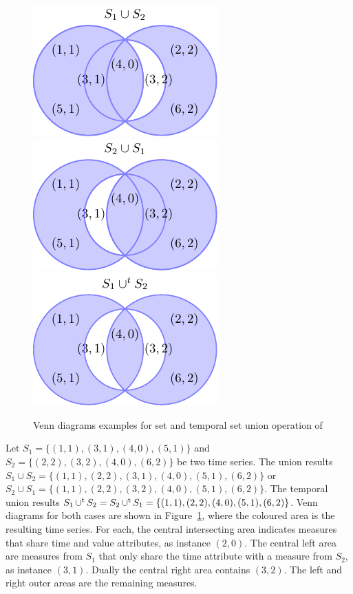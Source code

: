 \begin{figure}
  \centering
  \includegraphics{fig_model_venn.pdf}
  \includegraphics{fig_model_venn_reverse.pdf}
  \includegraphics{fig_model_venn2.pdf}
  \caption{Venn diagrams examples for set and temporal set union
    operation of }
  \label{fig:model:venn}
\end{figure}


\begin{example}\label{ex:model:s1s2}
  Let $S_1=\{(1,1),(3,1),(4,0),(5,1)\}$ and $S_2 = \allowbreak
  \{\allowbreak (2,\allowbreak 2),\allowbreak (3,2),(4,0),(6,2)\}$ be
  two time series. The union results $S_1 \cup S_2 =
  \{(1,1),\allowbreak (2,2),\allowbreak (3,1),\allowbreak (4,
  0),\allowbreak (5,1),\allowbreak (6,2)\}$ or $S_2 \cup S_1 =
  \{(1,1),\allowbreak (2,2),\allowbreak (3,2),\allowbreak (4,
  0),\allowbreak (5,1),\allowbreak (6,2)\}$. The temporal union
  results $S_1 \operatorname*{\cup^t} S_2 = S_2 \operatorname*{\cup^t} S_1 =
  \{(1,1),\allowbreak (2,2),\allowbreak (4,0),(5,1),\allowbreak (6,2)\}$. %
  Venn diagrams for both cases are shown in
  Figure~\ref{fig:model:venn}, where the coloured area is the
  resulting time series. For each, the central intersecting area
  indicates measures that share time and value attributes, as instance
  $(2,0)$. The central left area are measures from $S_1$ that only
  share the time attribute with a measure from $S_2$, as instance
  $(3,1)$. Dually the central right area contains $(3,2)$. The left
  and right outer areas are the remaining measures.
 \end{example}




